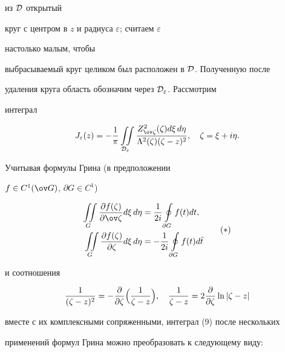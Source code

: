 из $\cal D$ открытый 


круг с центром в $z$ и радиуса $\varepsilon$; считаем $\varepsilon$ 


настолько малым, чтобы 


выбрасываемый круг целиком был расположен в $\cal D$. Полученную после 


удаления круга область обозначим через $\cal D_\varepsilon$. Рассмотрим 


интеграл 


\begin{equation} 


J_\varepsilon(z)=-\frac{1}{\pi}\iintl_{\cal D_\varepsilon} 


\frac{Z^2_{\ov\zeta}(\zeta)d\xi\,d\eta} 


{\Lambda^2(\zeta)(\zeta-z)^2},\quad\zeta=\xi+i\eta. 


\end{equation} 


Учитывая формулы Грина (в предположении 


$f\in C^1(\ov G)$, $\partial G\in C^1$) 


\begin{equation} 


\begin{split} 


\iintl_G\frac{\partial f(\zeta)}{\partial\ov\zeta}d\xi\,d\eta &= 


\frac{1}{2i}\ointl_{\partial G}f(t)dt,\\ 


\iintl_G\frac{\partial f(\zeta)}{\partial\zeta}d\xi\,d\eta &= 


-\frac{1}{2i}\ointl_{\partial G}f(t)d\Bar t


\end{split} 


\tag{$\ast$} 


\end{equation} 


и соотношения 


$$ 


\frac{1}{(\zeta-z)^2}=-\frac{\partial}{\partial\zeta} 


\Bigl(\frac{1}{\zeta-z}\Bigr),\quad 


\frac{1}{\zeta-z}=2\frac{\partial}{\partial\zeta}\ln|\zeta-z| 


$$ 


вместе с их комплексными сопряженными, интеграл (9) после нескольких 


применений формул Грина можно преобразовать к следующему виду: 



